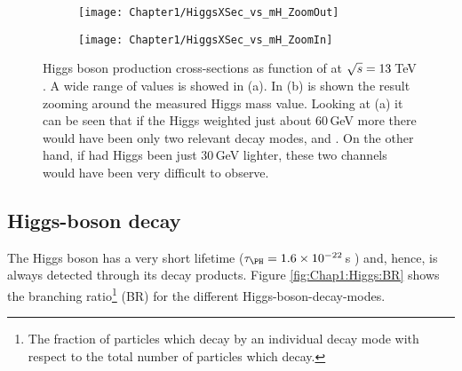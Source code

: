 \begin{figure}
\centering
\begin{subfigure}{.55\textwidth}
  \centering
  \texttt{[image: Chapter1/HiggsXSec\_vs\_mH\_ZoomOut]}
  \caption{}
  \label{fig:Chap1:Higgs:CrossSection:Out}
\end{subfigure}%
\begin{subfigure}{.45\textwidth}
  \centering
  \texttt{[image: Chapter1/HiggsXSec\_vs\_mH\_ZoomIn]}
  \caption{}
  \label{fig:Chap1:Higgs:CrossSection:In}
\end{subfigure}
\caption{Higgs boson production cross-sections as function of \mH 
at $\sqrt{s}=13\,$TeV \cite{LHCHiggsCrossSectionWorkingGroup:2016ypw}.
A wide range of \mH values is showed in (a). In (b) is shown the result zooming 
around the measured  Higgs mass value. Looking at (a) it can be seen that if the Higgs 
weighted just about $60\,$GeV more there would have been only two relevant decay 
modes, \HWW and \HZZ. On the other hand, if had Higgs been just $30\,$GeV lighter, these
two channels would have been very difficult to observe.}
\label{fig:Chap1:Higgs:CrossSection}
\end{figure} %

\subsection{Higgs-boson decay}
\label{sec:Chap1:Higgs_decay}

The Higgs boson has a very short lifetime ($\tau_{\PH} = 1.6 \times 10^{-22}\,$s \cite{LHCHiggsCrossSectionWorkingGroup:2016ypw}) and, hence,
is always detected through its decay products. 
Figure \ref{fig:Chap1:Higgs:BR} shows the branching ratio\footnote{The fraction of particles which decay by an 
individual decay mode with respect to the total number of particles which decay.} (BR) for the different Higgs-boson-decay-modes.

